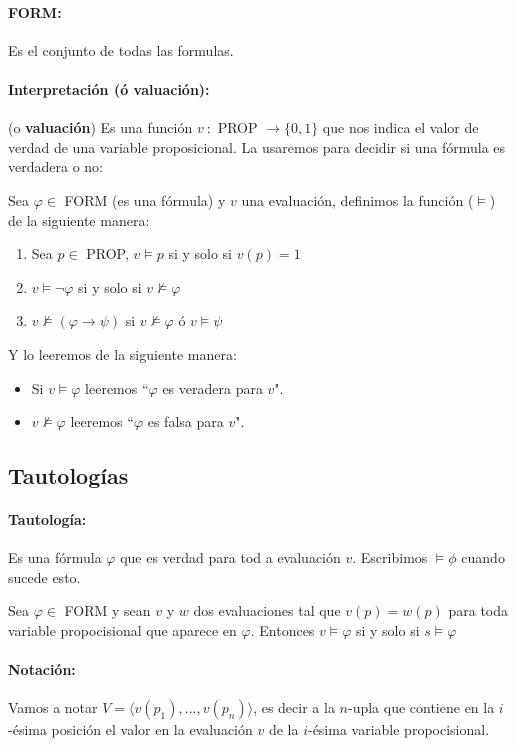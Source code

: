 \paragraph{FORM:} Es el conjunto de todas las formulas.

\paragraph{Interpretación (ó valuación):} (o \textbf{valuación}) Es una función $v~:$ PROP $\to\{0,1\}$ que nos indica el valor de verdad de una variable proposicional. La usaremos para decidir si una fórmula es verdadera o no:

Sea $\varphi \in$ FORM (es una fórmula) y $v$ una evaluación, definimos la función ($\vDash$) de la siguiente manera:
\begin{enumerate}
	\item Sea $p\in$ PROP, $v\vDash p$ si y solo si $v(p) = 1$
	\item $v \vDash \lnot\varphi$ si y solo si $v \nvDash\varphi$
	\item $v \nvDash (\varphi\rightarrow\psi)$ si $v \nvDash\varphi$ ó $v\vDash\psi$
\end{enumerate}

Y lo leeremos de la siguiente manera:
\begin{itemize}
	\item Si $v \vDash \varphi$ leeremos ``$\varphi$ es veradera para $v$".
	\item $v \nvDash\varphi$ leeremos  ``$\varphi$ es falsa para $v$".
\end{itemize}

\subsection{Tautologías}
\paragraph{Tautología:} Es una fórmula $\varphi$ que es verdad para tod	a evaluación $v$. Escribimos $\vDash \phi$ cuando sucede esto.

\begin{proposicion}
	Sea $\varphi\in$ FORM y sean $v$ y $w$ dos evaluaciones tal que $v(p) = w(p)$ para toda variable propocisional que aparece en $\varphi$. Entonces $v\vDash\varphi$ si y solo si $s\vDash\varphi$
\end{proposicion}

\paragraph{Notación:} Vamos a notar $V = \langle v(p_1),...,v(p_n) \rangle$, es decir a la $n$-upla que contiene en la $i$-ésima posición el valor en la evaluación $v$ de la $i$-ésima variable propocisional.

